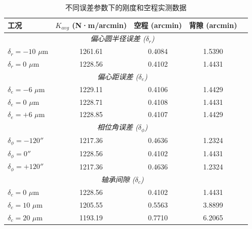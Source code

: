 \documentclass[12pt]{ctexart}
\begin{document}
\begin{table}[htbp]
\centering
\small
\caption{不同误差参数下的刚度和空程实测数据}
\label{tab:metrics}
\begin{tabular}{lcccc}
\toprule
工况 & $K_{avg}$ (N·m/arcmin) & 空程 (arcmin) & 背隙 (arcmin) \\
\midrule
\multicolumn{4}{c}{\textit{偏心圆半径误差 ($\delta_r$)}} \\
$\delta_r = -10$ $\mu$m & 1261.61 & 0.4084 & 1.5390 \\
$\delta_r = 0$ $\mu$m & 1228.56 & 0.4102 & 1.4431 \\
\midrule
\multicolumn{4}{c}{\textit{偏心距误差 ($\delta_e$)}} \\
$\delta_e = -6$ $\mu$m & 1229.11 & 0.4106 & 1.4429 \\
$\delta_e = 0$ $\mu$m & 1228.71 & 0.4108 & 1.4431 \\
$\delta_e = +6$ $\mu$m & 1228.85 & 0.4107 & 1.4429 \\
\midrule
\multicolumn{4}{c}{\textit{相位角误差 ($\delta_\phi$)}} \\
$\delta_\phi = -120''$ & 1217.36 & 0.4636 & 1.2324 \\
$\delta_\phi = 0''$ & 1228.56 & 0.4102 & 1.4431 \\
$\delta_\phi = +120''$ & 1217.36 & 0.4636 & 1.2324 \\
\midrule
\multicolumn{4}{c}{\textit{轴承间隙 ($\delta_c$)}} \\
$\delta_c = 0$ $\mu$m & 1228.56 & 0.4102 & 1.4431 \\
$\delta_c = 10$ $\mu$m & 1205.55 & 0.5563 & 3.8899 \\
$\delta_c = 20$ $\mu$m & 1193.19 & 0.7710 & 6.2065 \\
\bottomrule
\end{tabular}
\end{table}
\end{document}
